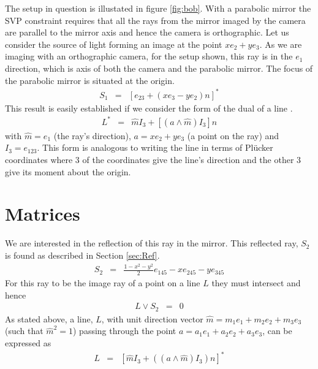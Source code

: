 The setup in question is illustated in figure \ref{fig:bob}. With a parabolic
mirror the SVP constraint requires that all the rays from the mirror imaged by
the camera are parallel to the mirror axis and hence the camera is
orthographic. Let us consider the source of light forming an image at the point
$xe_2 + ye_3$.  As we are imaging with an orthographic camera, for the setup
shown, this ray is in the $e_1$ direction, which is axis of both the camera and the parabolic mirror.  The focus of the parabolic mirror is situated at the origin. 
\begin{eqnarray}  
S_1&=& \left[e_{23} + (xe_3 - ye_2)n\right]^* \nonumber
\end{eqnarray} 
This result is easily established if we consider the form of the dual of a line \cite{cgwcga}.
\begin{eqnarray}
L^* &=&	\hat{m}I_3 + [(a\wedge \hat{m})I_3]n\nonumber
\end{eqnarray}
with $\hat{m} = e_1$ (the ray's direction), $a = xe_2 + ye_3$ (a point on the ray) and $I_3 = e_{123}$.
This form is analogous to writing the line in terms of Pl\"{u}cker coordinates where 3 of the coordinates give the line's direction and the other 3 give its moment about the origin.

\chapter{Matrices}

We are interested in the reflection of this ray in the mirror.  This reflected ray, $S_2$ is found as
described in Section \ref{sec:Ref}.  
\begin{eqnarray} 
\label{eq:1} 
S_2 &=& \frac{1-x^2-y^2}2e_{145} -xe_{245} - y e_{345} 
\end{eqnarray}  
For this ray to be the image ray of a point on a line $L$ they must intersect and hence
\begin{eqnarray} 
\label{eq:2} L\vee S_2 &=& 0 
\end{eqnarray} 
As stated above, a line, $L$, with unit direction vector $\hat{m} = m_1e_1 + m_2e_2 + m_3e_3$ (such that $\hat{m}^2 = 1$) passing through the point $a = a_1e_1 + a_2e_2 + a_3e_3$, can be expressed as 
\begin{eqnarray} 
\label{eq:3} L &=& \left[\hat{m}I_3 + ((a\wedge \hat{m})I_3)n\right]^* 
\end{eqnarray} 

